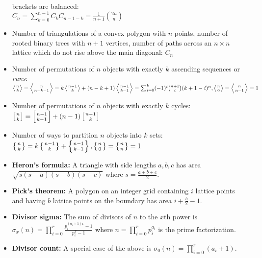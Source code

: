\documentclass[9pt,a4paper]{amsart}
\begin{document}
\begin{itemize}
                brackets are balanced: \\ $C_n = \sum_{k=0}^{n-1} C_kC_{n-1-k}
                = \frac{1}{n+1}\binom{2n}n$
            \item Number of triangulations of a convex polygon with $n$ points,
                number of rooted binary trees with $n+1$ vertices, number of
                paths across an $n\times n$ lattice which do not rise above the
                main diagonal: $C_n$
            \item Number of permutations of $n$ objects with exactly $k$
                ascending sequences or {\it runs}: \\ $\left\langle {n \atop k}
                \right\rangle = \left\langle {n \atop n - k - 1} \right\rangle
                = k\left\langle {n - 1 \atop k} \right\rangle + (n - k +
                1)\left\langle {n-1 \atop k-1} \right\rangle =
                \sum_{i=0}^{k}(-1)^i \binom{n+1}{i} (k+1-i)^n, \left\langle {n
                \atop 0} \right\rangle = \left\langle {n \atop n -1}
                \right\rangle = 1$
            \item Number of permutations of $n$ objects with exactly $k$
                cycles: $\left[n \atop k\right] = \left[n-1 \atop k-1\right] +
                (n-1)\left[n-1 \atop k\right]$
            \item Number of ways to partition $n$ objects into $k$ sets:
                $\left\{n \atop k\right\} = k\left\{n-1 \atop k\right\} +
                \left\{n-1 \atop k-1\right\}, \left\{n\atop 0\right\} =
                \left\{n\atop n\right\} = 1$
            \item \textbf{Heron's formula:} A triangle with side lengths
                $a,b,c$ has area $\sqrt{s(s-a)(s-b)(s-c)}$ where $s =
                \frac{a+b+c}{2}$.
            \item \textbf{Pick's theorem:} A polygon on an integer grid
                containing $i$ lattice points and having $b$ lattice points on
                the boundary has area $i + \frac{b}{2} - 1$.
            \item \textbf{Divisor sigma:} The sum of divisors of $n$ to the
                $x$th power is $\sigma_x(n) = \prod_{i=0}^{r} \frac{p_i^{(a_i +
                1)x} - 1}{p_i^x - 1}$ where $n = \prod_{i=0}^r p_i^{a_i}$ is
                the prime factorization.
            \item \textbf{Divisor count:} A special case of the above is
                $\sigma_0(n) = \prod_{i=0}^r (a_i + 1)$.

\end{itemize}
\end{document}
